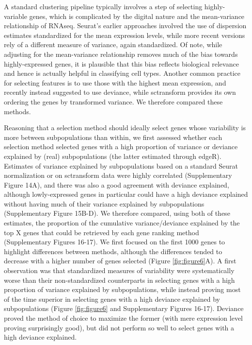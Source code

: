 \documentclass{bmcart}
\begin{document}
A standard clustering pipeline typically involves a step of selecting highly-variable genes, which is complicated by the digital nature and the mean-variance relationship of RNAseq. Seurat's earlier approaches involved the use of dispersion estimates standardized for the mean expression levels, while more recent versions rely of a different measure of variance, again standardized. Of note, while adjusting for the mean-variance relationship removes much of the bias towards highly-expressed genes, it is plausible that this bias reflects biological relevance and hence is actually helpful in classifying cell types. Another common practice for selecting features is to use those with the highest mean expression, and recently \citep{townesGlmpca2019} instead suggested to use deviance, while sctransform provides its own ordering the genes by transformed variance. We therefore compared these methods.

Reasoning that a selection method should ideally select genes whose variability is more between subpopulations than within, we first assessed whether each selection method selected genes with a high proportion of variance or deviance explained by (real) subpopulations (the latter estimated through edgeR). Estimates of variance explained by subpopulations based on a standard Seurat normalization or on sctransform data were highly correlated (Supplementary Figure 14A), and there was also a good agreement with deviance explained, although lowly-expressed genes in particular could have a high deviance explained without having much of their variance explained by subpopulations (Supplementary Figure 15B-D). We therefore compared, using both of these estimates, the proportion of the cumulative variance/deviance explained by the top X genes that could be retrieved by each gene ranking method (Supplementary Figures 16-17). We first focused on the first 1000 genes to highlight differences between methods, although the differences tended to decrease with a higher number of genes selected (Figure \ref{fig:figure6}A). A first observation was that standardized measures of variability were systematically worse than their non-standardized  counterparts in selecting genes with a high proportion of variance explained by subpopulations, while instead proving most of the time superior in selecting genes with a high deviance explained by subpopulations (Figure \ref{fig:figure6} and Supplementary Figures 16-17). Deviance proved the method of choice to maximize the former (with mere expression level proving surprisingly good), but did not perform so well to select genes with a high deviance explained.
\end{document}
